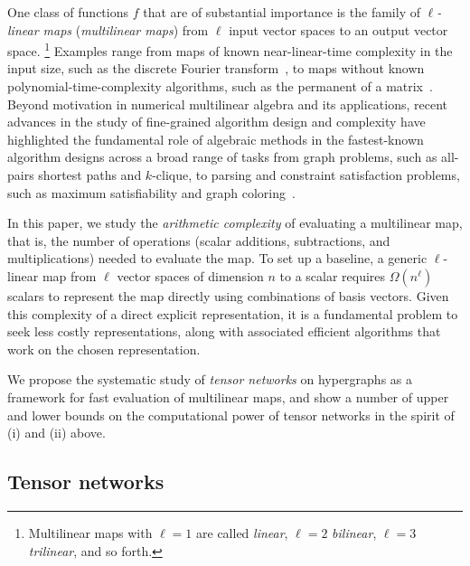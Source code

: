 \documentclass[11pt]{article}
\numberwithin{equation}{section}
\theoremstyle{definition}
\theoremstyle{plain}
\begin{document}
One class of functions $f$ that are of substantial importance is the family of \emph{$\ell$-linear maps} (\emph{multilinear maps}) from $\ell$ input vector spaces to an output vector space.%
\footnote{Multilinear maps with $\ell=1$ are called \emph{linear}, $\ell=2$ \emph{bilinear}, $\ell=3$ \emph{trilinear}, and so forth.}{}
Examples range from maps of known near-linear-time complexity in the input size, such as the discrete Fourier transform~\cite{CooleyT1965,VanLoan1992}, to maps without known polynomial-time-complexity algorithms, such as the permanent of a matrix~\cite{Ryser1963,Valiant1979}. Beyond motivation in numerical multilinear algebra and its applications, recent advances in the study of fine-grained algorithm design and complexity have highlighted the fundamental role of algebraic methods in the fastest-known algorithm designs across a broad range of tasks from graph problems, such as all-pairs shortest paths and $k$-clique, to parsing and constraint satisfaction problems, such as maximum satisfiability and graph coloring~\cite{AbboudBW15a,BjorklundHKK2008,BjorklundHK2009,EisenbrandG2004,ItaiR1978,Nesetril1985,Williams2005,Williams14apsp}.

In this paper, we study the \emph{arithmetic complexity} of evaluating
a multilinear map, that is, the number of operations (scalar additions,
subtractions, and multiplications) needed to evaluate the map.
To set up a baseline, a generic $\ell$-linear map from $\ell$ vector spaces
of dimension $n$ to a scalar requires $\Omega(n^\ell)$ scalars to represent
the map directly using combinations of basis vectors. Given this
complexity of a direct explicit representation, it is a fundamental
problem to seek less costly representations, along with associated
efficient algorithms that work on the chosen representation.

We propose the systematic study of \emph{tensor networks} on hypergraphs as
a framework for fast evaluation of multilinear maps, and show a number of
upper and lower bounds on the computational power of tensor networks
in the spirit of (i) and (ii) above.


\subsection{Tensor networks}

\label{sect:nets}
\end{document}
